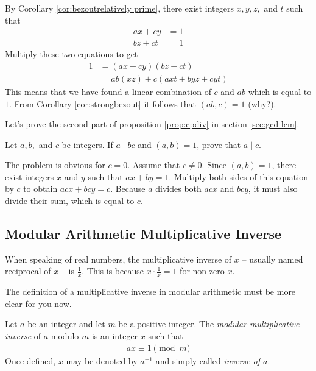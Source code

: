 \documentclass{subfile}
\begin{document}
	\begin{solution}
		By Corollary \ref{cor:bezoutrelatively prime}, there exist integers $x,y,z,$ and $t$ such that
			\begin{align*}
				ax+cy&=1\\
				bz+ct&=1
			\end{align*}
		Multiply these two equations to get
			\begin{align*}
				1 &= (ax+cy)(bz+ct)\\
				  &= ab(xz)+c(axt+byz+cyt)
			\end{align*}
		This means that we have found a linear combination of $c$ and $ab$ which is equal to $1$. From Corollary \ref{cor:strongbezout} it follows that $(ab,c)=1$ (why?).
	\end{solution}

	Let's prove the second part of proposition \eqref{prop:cpdiv} in section \eqref{sec:gcd-lcm}.

	\begin{problem}\label{prob:a|bc}
		Let $a,b,$ and $c$ be integers. If $a\mid bc$ and $(a,b)=1$, prove that $a\mid c$.
	\end{problem}

	\begin{solution}
		The problem is obvious for $c=0$. Assume that $c \neq 0$. Since $(a,b)=1$, there exist integers $x$ and $y$ such that $ax+by=1$. Multiply both sides of this equation by $c$ to obtain $acx+bcy=c$. Because $a$ divides both $acx$ and $bcy$, it must also divide their sum, which is equal to $c$.

	\end{solution}

	\subsection{Modular Arithmetic Multiplicative Inverse}\label{sec:arithinverse}

	When speaking of real numbers, the multiplicative inverse of $x$ -- usually named reciprocal of $x$ -- is $\frac{1}{x}$. This is because $x \cdot \frac{1}{x} = 1$ for non-zero $x$.

	The definition of a multiplicative inverse in modular arithmetic must be more clear for you now.

	\begin{definition}
		Let $a$ be an integer and let $m$ be a positive integer. The \textit{modular multiplicative inverse} of $a$ modulo $m$ is an integer $x$ such that
		\begin{align*}
		ax \equiv 1 \pmod m
		\end{align*}
		Once defined, $x$ may be denoted by $a^{-1}$ and simply called \textit{inverse of $a$}.
	\end{definition}
\end{document}
